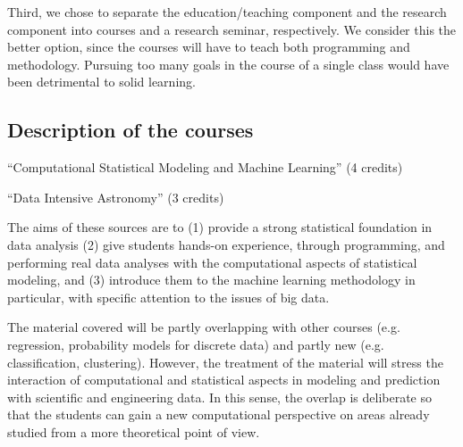 Third, we chose to separate the education/teaching component and the
research component into courses and a research seminar, respectively. We
consider this the better option, since the courses will have to teach
both programming and methodology. Pursuing too many goals in the
course of a single class would have been detrimental to solid learning.
 

\subsection{Description of the courses}
\label{sec:course-descr}

\bits
\item \statcl 
``Computational Statistical Modeling and Machine Learning'' (4 credits)
\item \astrocl ``Data Intensive Astronomy'' (3 credits)
\eits

The aims of these sources are to (1) provide a strong statistical
foundation in data analysis (2) give students hands-on experience,
through programming, and performing real data analyses with the
computational aspects of statistical modeling, and (3) introduce them
to the machine learning methodology in particular, with specific
attention to the issues of big data.

The material covered will be partly overlapping with other courses
(e.g. regression, probability models for discrete data) and partly new
(e.g. classification, clustering). However, the treatment of the
material will stress the interaction of computational and
statistical aspects in modeling and prediction with scientific and
engineering data. In this sense, the overlap is deliberate
so that the students can gain a new computational perspective on areas
already studied from a more theoretical point of view. 

